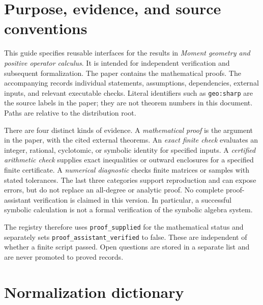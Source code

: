\section{Purpose, evidence, and source conventions}

This guide specifies reusable interfaces for the results in
\emph{Moment geometry and positive operator calculus}. It is intended for
independent verification and subsequent formalization. The paper contains
the mathematical proofs. The accompanying 
records individual statements, assumptions, dependencies, external inputs,
and relevant executable checks. Literal identifiers such as
\texttt{geo:sharp} are the source labels in the paper; they are not theorem
numbers in this document. Paths are relative to the distribution root.

There are four distinct kinds of evidence. A \emph{mathematical proof}
is the argument in the paper, with the cited external theorems. An
\emph{exact finite check} evaluates an integer, rational, cyclotomic, or
symbolic identity for specified inputs. A \emph{certified arithmetic
check} supplies exact inequalities or outward enclosures for a specified
finite certificate. A \emph{numerical diagnostic} checks finite matrices
or samples with stated tolerances. The last three categories support
reproduction and can expose errors, but do not replace an all-degree or
analytic proof. No complete proof-assistant verification is claimed in
this version. In particular, a successful symbolic calculation is not a
formal verification of the symbolic algebra system.

The registry therefore uses \texttt{proof\_supplied} for the mathematical
status and separately sets \texttt{proof\_assistant\_verified} to false.
These are independent of whether a finite script passed. Open questions
are stored in a separate list and are never promoted to proved records.

\section{Normalization dictionary}

